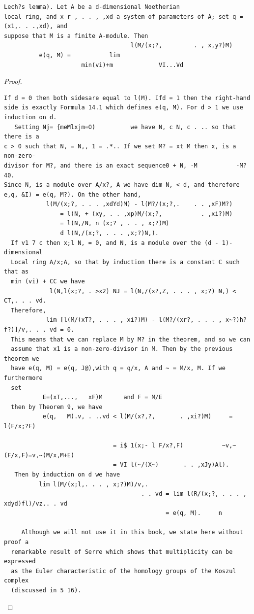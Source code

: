 \begin{theorem}\label{mcrt-auto-theorem-14-12}\uses{}
\begin{verbatim}
Lech?s lemma). Let A be a d-dimensional Noetherian
local ring, and x r , . . , ,xd a system of parameters of A; set q = (x1,. . .,xd), and
suppose that M is a finite A-module. Then
                                    l(M/(x;?,         . , x,y?)M)
          e(q, M) =           lim
                      min(vi)+m             VI...Vd
\end{verbatim}
\end{theorem}
\begin{proof}
\begin{verbatim}
If d = 0 then both sidesare equal to l(M). Ifd = 1 then the right-hand
side is exactly Formula 14.1 which defines e(q, M). For d > 1 we use
induction on d.
   Setting Nj= {meMlxjm=O)          we have N, c N, c . .. so that there is a
c > 0 such that N, = N,, 1 = .*.. If we set M? = xt M then x, is a non-zero-
divisor for M?, and there is an exact sequence0 + N, -M           -M?     40.
Since N, is a module over A/x?, A we have dim N, < d, and therefore
e,q, &I) = e(q, M?). On the other hand,
            l(M/(x;?, . . . ,xdYd)M) - l(M?/(x;?,.    . . ,xF)M?)
                = l(N, + (xy, . . ,xp)M/(x;?,           . ,xi?)M)
                = l(N,/N, n (x;? , . . , x;?)M)
                d l(N,/(x;?, . . . ,x;?)N,).
  If v1 7 c then x;l N, = 0, and N, is a module over the (d - 1)-dimensional
  Local ring A/x;A, so that by induction there is a constant C such that as
  min (vi) + CC we have
             l(N,l(x;?, . >x2) NJ = l(N,/(x?,Z, . . . , x;?) N,) < CT,. . . vd.
  Therefore,
            lim [l(M/(xT?, . . . , xi?)M) - l(M?/(xr?, . . . , x~?)h?f?)]/v,. . . vd = 0.
  This means that we can replace M by M? in the theorem, and so we can
  assume that x1 is a non-zero-divisor in M. Then by the previous theorem we
  have e(q, M) = e(q, J@),with q = q/x, A and ~ = M/x, M. If we furthermore
  set
           E=(xT,...,   xF)M      and F = M/E
  then by Theorem 9, we have
           e(q,   M).v, . ..vd < l(M/(x?,?,       . ,xi?)M)     = l(F/x;?F)

                               = i$ 1(x;- l F/x?,F)           ~v,~(F/x,F)=v,~(M/x,M+E)
                               = VI l(~/(X~)       . . ,xJy)Al).
   Then by induction on d we have
          lim l(M/(x;l,. . . , x;?)M)/v,.
                                       . . vd = lim l(R/(x;?, . . . , xdyd)fl)/vz.. . vd
                                              = e(q, M).     n

     Although we will not use it in this book, we state here without proof a
  remarkable result of Serre which shows that multiplicity can be expressed
  as the Euler characteristic of the homology groups of the Koszul complex
  (discussed in 5 16).
\end{verbatim}
\end{proof}



